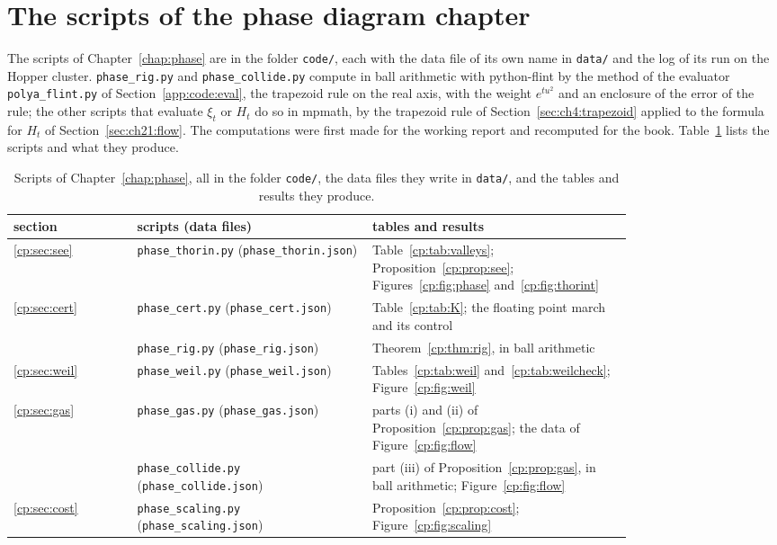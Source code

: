 \section{The scripts of the phase diagram chapter}\label{app:phase}

The scripts of Chapter~\ref{chap:phase} are in the folder \texttt{code/}, each with the data file of its own name in \texttt{data/} and the log of its run on the Hopper cluster. \texttt{phase\_rig.py} and \texttt{phase\_collide.py} compute in ball arithmetic with python-flint \cite{Arb} by the method of the evaluator \texttt{polya\_flint.py} of Section~\ref{app:code:eval}, the trapezoid rule on the real axis, with the weight $e^{tu^2}$ and an enclosure of the error of the rule; the other scripts that evaluate $\xi_t$ or $H_t$ do so in mpmath, by the trapezoid rule of Section~\ref{sec:ch4:trapezoid} applied to the formula for $H_t$ of Section~\ref{sec:ch21:flow}. The computations were first made for the working report \cite{FA26} and recomputed for the book. Table~\ref{tab:app:phase} lists the scripts and what they produce.

\begin{table}[htbp]
\centering\footnotesize
\begin{tabular}{@{}lp{0.38\linewidth}p{0.42\linewidth}@{}}
\toprule
section & scripts (data files) & tables and results\\
\midrule
\ref{cp:sec:see} & \raggedright \texttt{phase\_thorin.py} (\texttt{phase\_thorin.json}) & \raggedright Table~\ref{cp:tab:valleys}; Proposition~\ref{cp:prop:see}; Figures~\ref{cp:fig:phase} and~\ref{cp:fig:thorint}\tabularnewline
\ref{cp:sec:cert} & \raggedright \texttt{phase\_cert.py} (\texttt{phase\_cert.json}) & \raggedright Table~\ref{cp:tab:K}; the floating point march and its control\tabularnewline
 & \raggedright \texttt{phase\_rig.py} (\texttt{phase\_rig.json}) & \raggedright Theorem~\ref{cp:thm:rig}, in ball arithmetic\tabularnewline
\ref{cp:sec:weil} & \raggedright \texttt{phase\_weil.py} (\texttt{phase\_weil.json}) & \raggedright Tables~\ref{cp:tab:weil} and~\ref{cp:tab:weilcheck}; Figure~\ref{cp:fig:weil}\tabularnewline
\ref{cp:sec:gas} & \raggedright \texttt{phase\_gas.py} (\texttt{phase\_gas.json}) & \raggedright parts (i) and (ii) of Proposition~\ref{cp:prop:gas}; the data of Figure~\ref{cp:fig:flow}\tabularnewline
 & \raggedright \texttt{phase\_collide.py} (\texttt{phase\_collide.json}) & \raggedright part (iii) of Proposition~\ref{cp:prop:gas}, in ball arithmetic; Figure~\ref{cp:fig:flow}\tabularnewline
\ref{cp:sec:cost} & \raggedright \texttt{phase\_scaling.py} (\texttt{phase\_scaling.json}) & \raggedright Proposition~\ref{cp:prop:cost}; Figure~\ref{cp:fig:scaling}\tabularnewline
\bottomrule
\end{tabular}
\caption{Scripts of Chapter~\ref{chap:phase}, all in the folder \texttt{code/}, the data files they write in \texttt{data/}, and the tables and results they produce.}
\label{tab:app:phase}
\end{table}
